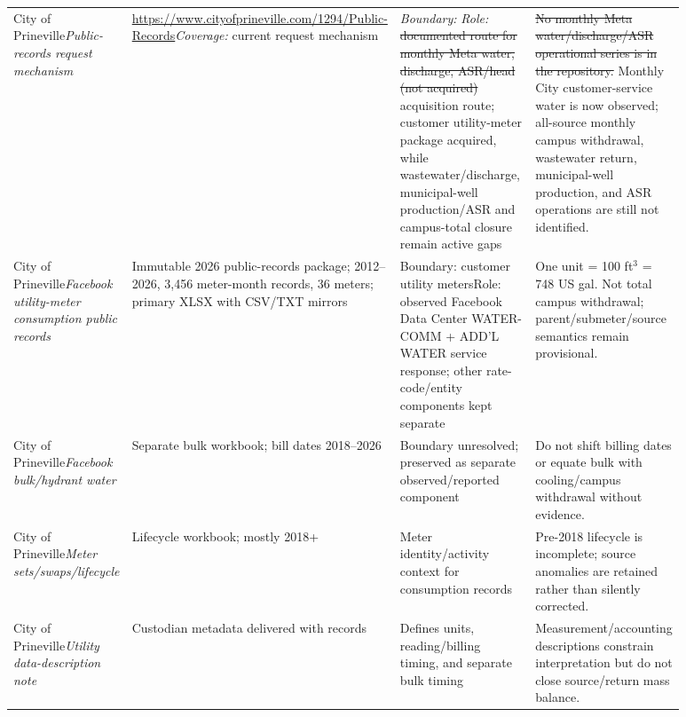 \documentclass[11pt]{article}
\newcommand{\oldtxt}[1]{\textcolor{blue!70!black}{\sout{#1}}}
\newcommand{\latesttxt}[1]{\textcolor{purple!85!black}{#1}}
\begin{document}
\begin{longtable}{@{}p{0.18\linewidth}p{0.25\linewidth}p{0.25\linewidth}p{0.20\linewidth}@{}}
City of Prineville\newline \textit{Public-records request mechanism} & \url{https://www.cityofprineville.com/1294/Public-Records}\newline \textit{Coverage:} current request mechanism & \textit{Boundary:} \newline \textit{Role:} \oldtxt{documented route for monthly Meta water, discharge, ASR/head (not acquired)} \latesttxt{acquisition route; customer utility-meter package acquired, while wastewater/discharge, municipal-well production/ASR and campus-total closure remain active gaps} & \oldtxt{No monthly Meta water/discharge/ASR operational series is in the repository.} \latesttxt{Monthly City customer-service water is now observed; all-source monthly campus withdrawal, wastewater return, municipal-well production, and ASR operations are still not identified.}\\
\latesttxt{City of Prineville\newline \textit{Facebook utility-meter consumption public records}} & \latesttxt{Immutable 2026 public-records package; 2012--2026, 3,456 meter-month records, 36 meters; primary XLSX with CSV/TXT mirrors} & \latesttxt{Boundary: customer utility meters\newline Role: observed Facebook Data Center WATER-COMM + ADD'L WATER service response; other rate-code/entity components kept separate} & \latesttxt{One unit = 100 ft\(^3\) = 748 US gal. Not total campus withdrawal; parent/submeter/source semantics remain provisional.}\\
\latesttxt{City of Prineville\newline \textit{Facebook bulk/hydrant water}} & \latesttxt{Separate bulk workbook; bill dates 2018--2026} & \latesttxt{Boundary unresolved; preserved as separate observed/reported component} & \latesttxt{Do not shift billing dates or equate bulk with cooling/campus withdrawal without evidence.}\\
\latesttxt{City of Prineville\newline \textit{Meter sets/swaps/lifecycle}} & \latesttxt{Lifecycle workbook; mostly 2018+} & \latesttxt{Meter identity/activity context for consumption records} & \latesttxt{Pre-2018 lifecycle is incomplete; source anomalies are retained rather than silently corrected.}\\
\latesttxt{City of Prineville\newline \textit{Utility data-description note}} & \latesttxt{Custodian metadata delivered with records} & \latesttxt{Defines units, reading/billing timing, and separate bulk timing} & \latesttxt{Measurement/accounting descriptions constrain interpretation but do not close source/return mass balance.}\\

\end{longtable}
\end{document}

